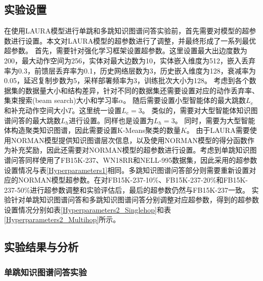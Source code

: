 \documentclass[algorithmlist, AutoFakeBold, AutoFakeSlant, figurelist, tablelist, nomlist, engineering]{seuthesix}
\begin{document}
\subsection{实验设置}
在使用LAURA模型进行单跳和多跳知识图谱问答实验前，首先需要对模型的超参数进行设置。本文对LAURA模型的超参数进行了调整，并最终形成了一系列最优超参数。
首先，需要针对强化学习框架设置超参数。这里设置最大出边度数为200，最大动作空间为256，实体对最大边数为10，实体嵌入维度为512，嵌入丢弃率为0.3，前馈层丢弃率为0.1，历史网络层数为3，历史嵌入维度为128，衰减率为0.05，延迟复制步数为5，采样部署频率为3，训练批次大小为128。
考虑到各个数据集的数据量大小和结构差异，针对不同的数据集还需要设置对应的动作丢弃率、集束搜索(beam search)大小和学习率$\alpha$。
随后需要设置小型智能体的最大跳数$L_e$和补充动作空间大小$T$。这里统一设置$L_e = 3$。
类似的，需要对大型智能体知识图谱问答的最大跳数$L_h$进行设置。同样也是设置为$L_h = 3$。
同时，需要为大型智能体构造聚类知识图谱，因此需要设置K-Means聚类的数量$K$。
由于LAURA需要使用NORMAN模型提供知识图谱层次信息，以及使用NORMAN模型的得分函数作为补充奖励，因此还需要对NORMAN模型的超参数进行设置。考虑到单跳知识图谱问答同样使用了FB15K-237、WN18RR和NELL-995数据集，因此采用的超参数设置情况与表\ref{Hyperparameters1}相同。多跳知识图谱问答部分则需要重新设置对应的NORMAN模型超参数。在对FB15K-237-10\%、FB15K-237-20\%和FB15K-237-50\%进行超参数调整和实验评估后，最后的超参数仍然与FB15K-237一致。
实验针对单跳知识图谱问答和多跳知识图谱问答分别调整对应超参数，得到的超参数设置情况分别如表\ref{Hyperparameters2_Singlehop}和表\ref{Hyperparameters2_Multihop}所示。

\subsection{实验结果与分析}
\subsubsection{单跳知识图谱问答实验}
\end{document}
